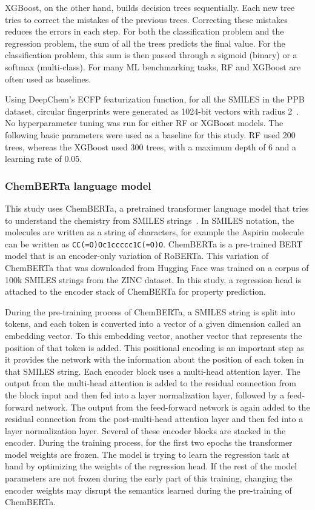 \documentclass[11pt,a4paper]{article}
\begin{document}
XGBoost, on the other hand, builds decision trees sequentially.
Each new tree tries to correct the mistakes of the previous trees.
Correcting these mistakes reduces the errors in each step.
For both the classification problem and the regression problem, the sum of all the trees predicts the final value.
For the classification problem, this sum is then passed through a sigmoid (binary) or a softmax (multi-class).
For many ML benchmarking tasks, RF and XGBoost are often used as baselines.

Using DeepChem's ECFP featurization function, for all the SMILES in the PPB dataset, circular fingerprints were generated as 1024-bit vectors with radius 2~\cite{rogers2010ecfp}.
No hyperparameter tuning was run for either RF or XGBoost models.
The following basic parameters were used as a baseline for this study.
RF used 200 trees, whereas the XGBoost used 300 trees, with a maximum depth of 6 and a learning rate of 0.05.

\subsubsection{ChemBERTa language model}
This study uses ChemBERTa, a pretrained transformer language model that tries to understand the chemistry from SMILES strings~\cite{chithrananda2020chemberta}.
In SMILES notation, the molecules are written as a string of characters, for example the Aspirin molecule can be written as \texttt{CC(=O)Oc1ccccc1C(=O)O}.
ChemBERTa is a pre-trained BERT model that is an encoder-only variation of RoBERTa.
This variation of ChemBERTa that was downloaded from Hugging Face was trained on a corpus of 100k SMILES strings from the ZINC dataset.
In this study, a regression head is attached to the encoder stack of ChemBERTa for property prediction.

During the pre-training process of ChemBERTa, a SMILES string is split into tokens, and each token is converted into a vector of a given dimension called an embedding vector.
To this embedding vector, another vector that represents the position of that token is added.
This positional encoding is an important step as it provides the network with the information about the position of each token in that SMILES string.
Each encoder block uses a multi-head attention layer.
The output from the multi-head attention is added to the residual connection from the block input and then fed into a layer normalization layer, followed by a feed-forward network.
The output from the feed-forward network is again added to the residual connection from the post-multi-head attention layer and then fed into a layer normalization layer.
Several of these encoder blocks are stacked in the encoder.
During the training process, for the first two epochs the transformer model weights are frozen.
The model is trying to learn the regression task at hand by optimizing the weights of the regression head.
If the rest of the model parameters are not frozen during the early part of this training, changing the encoder weights may disrupt the semantics learned during the pre-training of ChemBERTa.
\end{document}
